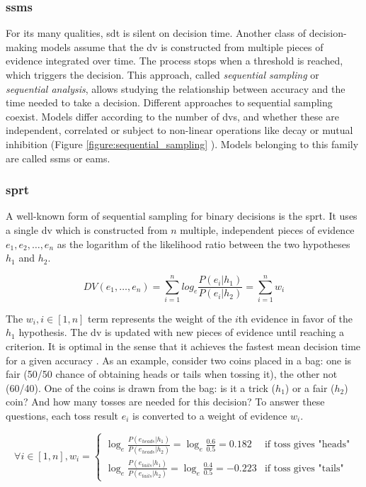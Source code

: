 \subsubsection{\acrlong{ssm}s}

For its many qualities, \acrlong{sdt} is silent on decision time. Another class of decision-making models assume that the \acrshort{dv} is constructed from multiple pieces of evidence integrated over time. The process stops when a threshold is reached, which triggers the decision. This approach, called \textit{\gls{sequential sampling}} or \textit{sequential analysis}, allows studying the relationship between accuracy and the time needed to take a decision. Different approaches to sequential sampling coexist. Models differ according to the number of \acrlong{dv}s, and whether these are independent, correlated or subject to non-linear operations like decay or mutual inhibition (Figure \ref{figure:sequential_sampling} ). Models belonging to this family are called \acrlong{ssm}s or \acrlong{eam}s.

\subsubsection{\acrlong{sprt}}

A well-known form of sequential sampling for binary decisions is the \acrfull{sprt}. It uses a single \acrlong{dv} which is constructed from $n$ multiple, independent pieces of evidence $e_1, e_2, \dots, e_n$ as the logarithm of the likelihood ratio between the two hypotheses $h_1$ and $h_2$.

$$DV(e_1, \dots, e_n) = \sum_{i=1}^n log_e \frac{P(e_i|h_1)}{P(e_i|h_2)} = \sum_{i=1}^n w_i$$

The $w_i, i \in [1,n]$ term represents the weight of the $i$th evidence in favor of the $h_1$ hypothesis. The \Acrshort{dv} is updated with new pieces of evidence until reaching a criterion. It is optimal in the sense that it achieves the fastest mean decision time for a given accuracy \cite{bogaczOptimalDecisionmakingTheories2007}. As an example, consider two coins placed in a bag: one is fair (50/50 chance of obtaining heads or tails when tossing it), the other not (60/40). One of the coins is drawn from the bag: is it a trick ($h_1$) or a fair ($h_2$) coin? And how many tosses are needed for this decision? To answer these questions, each toss result $e_i$ is converted to a weight of evidence $w_i$.

$$\forall i \in[1,n], w_i=
    \begin{cases}
        \log_e \frac{P(e_{heads}|h_1)}{P(e_{heads}|h_2)} = \log_e \frac{0.6}{0.5} = 0.182  & \text{if toss gives "heads"} \\
        \log_e \frac{P(e_{tails}|h_1)}{P(e_{tails}|h_2)} = \log_e \frac{0.4}{0.5} = -0.223 & \text{if toss gives "tails"}
    \end{cases}$$

